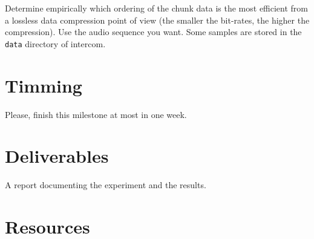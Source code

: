 Determine empirically which ordering of the chunk data is the most
efficient from a lossless data compression point of view (the smaller
the bit-rates, the higher the compression). Use the audio sequence you
want. Some samples are stored in the \verb|data| directory of
intercom.

\section{Timming}

Please, finish this milestone at most in one week.

\section{Deliverables}

A report documenting the experiment and the results.


\section{Resources}


